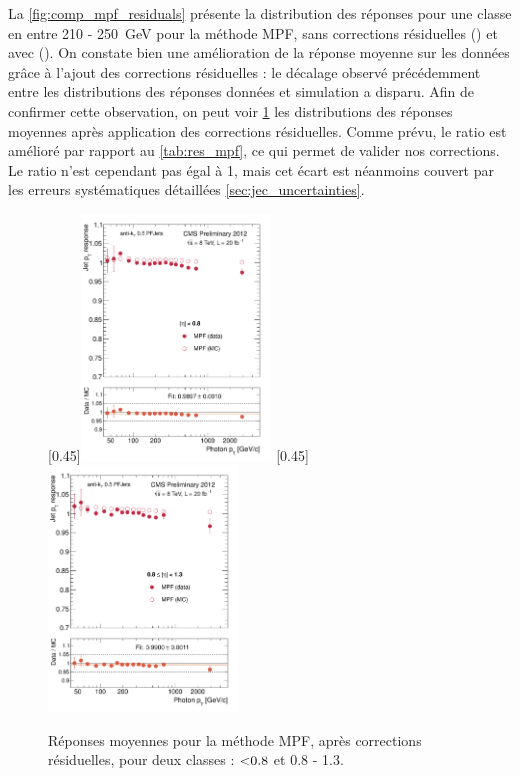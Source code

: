 La \cref{fig:comp_mpf_residuals} présente la distribution des réponses pour une classe en \ptg entre 210 - \SI{250}{\GeV} pour la méthode MPF, sans corrections résiduelles () et avec (). On constate bien une amélioration de la réponse moyenne sur les données grâce à l'ajout des corrections résiduelles : le décalage observé précédemment entre les distributions des réponses données et simulation a disparu. Afin de confirmer cette observation, on peut voir \cref{fig:comp_mpf_residuals_2} les distributions des réponses moyennes après application des corrections résiduelles. Comme prévu, le ratio est amélioré par rapport au \cref{tab:res_mpf}, ce qui permet de valider nos corrections. Le ratio n'est cependant pas égal à 1, mais cet écart est néanmoins couvert par les erreurs systématiques détaillées \cref{sec:jec_uncertainties}.

\begin{figure}[tbp]
    \centering
    \subcaptionbox{\label{fig:resp_mpf_residuals_eta008}}[0.45\textwidth]{\includegraphics[width=0.45\textwidth]{chapitre4/figs/resp_mpf_residuals/response_eta008_mpf.pdf}} \qquad
    \subcaptionbox{\label{fig:resp_mpf_residuals_eta0813}}[0.45\textwidth]{\includegraphics[width=0.45\textwidth]{chapitre4/figs/resp_mpf_residuals/response_eta0813_mpf.pdf}}
    \caption{Réponses moyennes pour la méthode MPF, après corrections résiduelles, pour deux classes \aeta : $\num{< 0.8}$ et \num{0.8} - \num{1.3}.}
    \label{fig:comp_mpf_residuals_2}
\end{figure}

